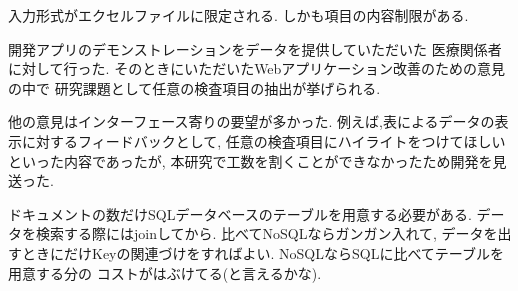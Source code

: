   入力形式がエクセルファイルに限定される.
  しかも項目の内容制限がある.



  開発アプリのデモンストレーションをデータを提供していただいた
  医療関係者に対して行った.
  そのときにいただいたWebアプリケーション改善のための意見の中で
  研究課題として任意の検査項目の抽出が挙げられる.

  他の意見はインターフェース寄りの要望が多かった.
  例えば,表によるデータの表示に対するフィードバックとして,
  任意の検査項目にハイライトをつけてほしいといった内容であったが,
  本研究で工数を割くことができなかったため開発を見送った.


  ドキュメントの数だけSQLデータベースのテーブルを用意する必要がある.
  データを検索する際にはjoinしてから.
  比べてNoSQLならガンガン入れて,
  データを出すときにだけKeyの関連づけをすればよい.
  NoSQLならSQLに比べてテーブルを用意する分の
  コストがはぶけてる(と言えるかな).
  \fi
